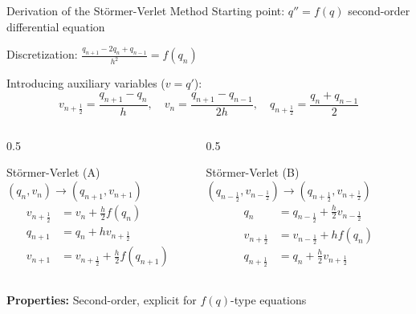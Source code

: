 \documentclass[aspectratio=169]{beamer}
\begin{document}
\begin{frame}{Derivation of the Störmer-Verlet Method}
\small
Starting point: $q'' = f(q)$ second-order differential equation

Discretization: $\frac{q_{n+1}-2q_n+q_{n-1}}{h^2} = f(q_n)$

Introducing auxiliary variables ($v = q'$):
\begin{equation*}
    v_{n+\frac{1}{2}} = \frac{q_{n+1}-q_n}{h}, \quad v_n = \frac{q_{n+1}-q_{n-1}}{2h}, \quad q_{n+\frac{1}{2}}=\frac{q_n+q_{n-1}}{2}
\end{equation*}

\vspace{0.2cm}

\begin{columns}
\begin{column}{0.5\textwidth}
\begin{block}{Störmer-Verlet (A)}
\small
$(q_n,v_n) \to (q_{n+1},v_{n+1})$
\begin{equation*}
\begin{aligned}
    v_{n+\frac{1}{2}} &= v_n + \frac{h}{2}f(q_n) \\
    q_{n+1} &= q_n + h v_{n+\frac{1}{2}} \\
    v_{n+1} &= v_{n+\frac{1}{2}} + \frac{h}{2}f(q_{n+1})
\end{aligned}
\end{equation*}
\end{block}
\end{column}
\begin{column}{0.5\textwidth}
\begin{block}{Störmer-Verlet (B)}
\small
$(q_{n-\frac{1}{2}},v_{n-\frac{1}{2}}) \to (q_{n+\frac{1}{2}},v_{n+\frac{1}{2}})$
\begin{equation*}
\begin{aligned}
    q_n &= q_{n-\frac{1}{2}} + \frac{h}{2}v_{n-\frac{1}{2}} \\
    v_{n+\frac{1}{2}} &= v_{n-\frac{1}{2}} + hf(q_n) \\
    q_{n+\frac{1}{2}} &= q_n + \frac{h}{2}v_{n+\frac{1}{2}}
\end{aligned}
\end{equation*}
\end{block}
\end{column}
\end{columns}

\vspace{0.2cm}
\small
\textbf{Properties:} Second-order, explicit for $f(q)$-type equations
\end{frame}
\end{document}
